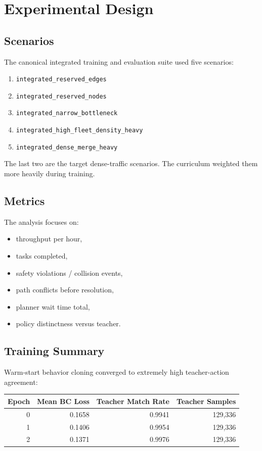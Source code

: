 \documentclass[11pt]{article}
\begin{document}
\section{Experimental Design}
\subsection{Scenarios}
The canonical integrated training and evaluation suite used five scenarios:
\begin{enumerate}[leftmargin=1.5em]
    \item \texttt{integrated\_reserved\_edges}
    \item \texttt{integrated\_reserved\_nodes}
    \item \texttt{integrated\_narrow\_bottleneck}
    \item \texttt{integrated\_high\_fleet\_density\_heavy}
    \item \texttt{integrated\_dense\_merge\_heavy}
\end{enumerate}

The last two are the target dense-traffic scenarios. The curriculum weighted them more heavily during training.

\subsection{Metrics}
The analysis focuses on:
\begin{itemize}[leftmargin=1.5em]
    \item throughput per hour,
    \item tasks completed,
    \item safety violations / collision events,
    \item path conflicts before resolution,
    \item planner wait time total,
    \item policy distinctness versus teacher.
\end{itemize}

\subsection{Training Summary}
Warm-start behavior cloning converged to extremely high teacher-action agreement:
\begin{center}
\begin{tabular}{rrrr}
\toprule
Epoch & Mean BC Loss & Teacher Match Rate & Teacher Samples \\
\midrule
0 & 0.1658 & 0.9941 & 129{,}336 \\
1 & 0.1406 & 0.9954 & 129{,}336 \\
2 & 0.1371 & 0.9976 & 129{,}336 \\
\bottomrule
\end{tabular}
\end{center}
\end{document}
